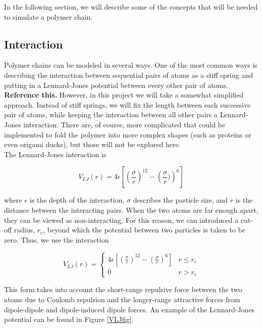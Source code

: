 \documentclass{article}
\begin{document}
\begin{multicols}{2}
In the following section, we will describe some of the concepts that will be needed to simulate a polymer chain.

\subsection{Interaction}

Polymer chains can be modeled in several ways.  One of the most common ways is describing the interaction between sequential pairs of atoms as a stiff spring and putting in a Lennard-Jones potential between every other pair of atoms.  \textbf{Reference this.}  However, in this project we will take a somewhat simplified approach.  Instead of stiff springs, we will fix the length between each successive pair of atoms, while keeping the interaction between all other pairs a Lennard-Jones interaction.  There are, of course, more complicated that could be implemented to fold the polymer into more complex shapes (such as proteins or even origami ducks), but those will not be explored here.\\

The Lennard-Jones interaction is 

\begin{equation}
V_{LJ}(r) = 4\epsilon \left [ \left ( \frac{\sigma}{r} \right ) ^{12} - \left ( \frac{\sigma}{r}) \right ) ^6 \right ]
\end{equation}

\noindent where $\epsilon$ is the depth of the interaction, $\sigma$ describes the particle size, and $r$ is the distance between the interacting pairs.  When the two atoms are far enough apart, they can be viewed as non-interacting.  For this reason, we can introduced a cut-off radius, $r_c$, beyond which the potential between two particles is taken to be zero.  Thus, we use the interaction 

\begin{equation}
V_{LJ} (r) = \begin{cases}
4 \epsilon \left [ \left (\frac{\sigma}{r} \right )^{12} - \left (\frac{\sigma}{r} \right )^{6} \right ] & r \le r_c \\
0 & r > r_c
\end{cases}
\label{cutoff}
\end{equation}

This form takes into account the short-range repulsive force between the two atoms due to Coulomb repulsion and the longer-range attractive forces from dipole-dipole and dipole-induced dipole forces.  An example of the Lennard-Jones potential can be found in Figure \ref{VLJfig}.


\end{multicols}
\end{document}
